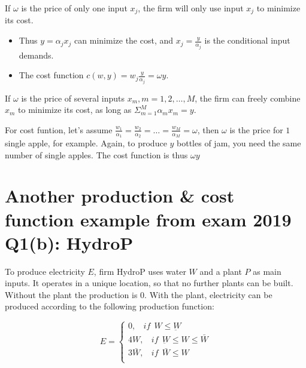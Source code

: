 \documentclass{article}
\begin{document}
\vspace{2mm}

If $\omega$ is the price of only one input $x_j$, the firm will only use input $x_j$ to minimize its cost. 

\begin{itemize}
\item Thus $y = \alpha_j x_j$ can minimize the cost, and $x_j = \frac{y}{\alpha_j}$ is the conditional input demands.
\item The cost function $c(w,y) = w_j \frac{y}{\alpha_j} = \omega y$.
\end{itemize}


If $\omega$ is the price of several inputs $x_m, m = 1,2, \dots, M$, the firm can freely combine $x_m$ to minimize its cost, as long as  $\Sigma^M_{m=1} \alpha_m x_m = y$.

\vspace{2mm}

For cost funtion, let's assume $\frac{w_1}{\alpha_1} = \frac{w_2}{\alpha_2}= \dots =\frac{w_M}{\alpha_M} = \omega$, then $\omega$ is the price for $1$ single apple, for example. Again, to produce $y$ bottles of jam, you need the same number of single apples. The cost function is thus $\omega y$

\section{Another production \& cost function example from exam 2019 Q1(b): HydroP}

To produce electricity $E$, firm HydroP uses water $W$ and a plant $P$ as
main inputs. It operates in a unique location, so that no further plants can be
built. Without the plant the production is $0$. With the plant, electricity can be
produced according to the following production function:


\begin{equation}
E=
    \begin{cases}
0, \ \ \ \ if \ \ W \le \underbar{W} \\
4W, \ \ \ \ if \ \   \underbar{W} \le   W \le \bar{W} \\
3\bar{W}, \ \ \ \ if \ \ \bar{W} \le W \\
    \end{cases}
    \label{eq:hydro}   
\end{equation}

\end{document}
